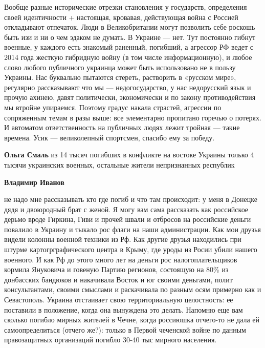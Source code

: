 \begin{itemize}

Вообще разные исторические отрезки становления у государств, определения своей
идентичности + настоящая, кровавая, действующая война с Россией откладывают
отпечаток. Люди в Великобритании могут позволить себе роскошь быть изи и ни о
чем эдаком не думать. В Украине — нет. Тут постоянно гибнут военные, у каждого
есть знакомый раненный, погибший, а агрессор РФ ведет с 2014 года жесткую
гибридную войну (в том числе информационную), и любое слово любого публичного
украинца может быть использовано не в пользу Украины. Нас буквально пытаются
стереть, растворить в «русском мире», регулярно рассказывают что мы —
недогосударство, у нас недорусский язык и прочую ахинею, давят политически,
экономически и по закону противодействия мы втройне упираемся. Поэтому градус
накала страстей, агрессии по сопряженным темам в разы выше: все элементарно
пропитано горечью о потерях. И автоматом ответственность на публичных людях
лежит тройная — такие времена. Усик — великолепный спортсмен, спасибо ему за
победу.

\begin{itemize} %


\textbf{Ольга Смаль} из 14 тысяч погибших в конфликте на востоке Украины только 4 тысячи украинских военных, остальные жители непризнанных республик

\textbf{Владимир Иванов} 

не надо мне рассказывать кто где погиб и что там происходит: у меня в Донецке
дядя и двоюродный брат с женой. Я могу вам сама рассказать как российское
дерьмо вроде Гиркина, Гиви и прочей швали и отбросов на российские деньги
повалило в Украину и тыкало рос флаги на наши администрации. Как мои друзья
видели колонны военной техники из Рф. Как другие друзья находились при штурме
картогрграфического центра в Крыму, где уроды из Росии убили нашего военного. И
как Рф до этого много лет на деньги рос налогоплательщиков кормила Януковича и
говеную Партию регионов, состоящую на 80\% из донбасских бандюков и накачивала
Восток и юг своими деньгами, полит консультантами, своими смыслами и
раскачивала по разным осям примерно как и Севастополь. Украина отстаивает свою
территориальную целостность: ее поставили в положение, когда она вынуждена это
делать. Напомню еще вам сколько погибло мирных жителей в Чечне, когда россиюшка
отчего-то не дала ей самоопределиться (отчего же?): только в Первой чеченской
войне по данным правозащитных организаций погибло 30-40 тыс мирного населения.


\end{itemize}
\end{itemize}
